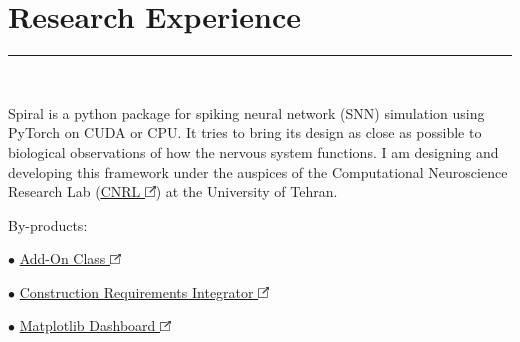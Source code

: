 \documentclass[]{rahulworld-resume}
\begin{document}
\begin{minipage}[t]{0.595\textwidth} 

	\section{Research Experience}
	\vspace{-5pt}\noindent\rule{\textwidth}{0.4pt}
	 
	\noindent
	\hspace{5em}%
	\begin{minipage}{0.85\textwidth\vspace{5pt}}
		\vspace{3pt}\\
		\begin{justifying}
			Spiral is a python package for spiking neural network (SNN) simulation using PyTorch on CUDA or CPU.
			It tries to bring its design as close as possible to biological observations of how the nervous system functions.
			I am designing and developing this framework under the auspices of the Computational Neuroscience Research Lab (\href{https://cnrl.ut.ac.ir/}{\underline{CNRL \includegraphics[width=8pt]{icons/redirect.png}}}) at the University of Tehran.
		
			By-products:

			$\bullet$ \href{https://pypi.org/project/add-on-class/}{Add-On Class \includegraphics[width=8pt]{icons/redirect.png}}
			
			$\bullet$ \href{https://pypi.org/project/construction-requirements-integrator/}{Construction Requirements Integrator \includegraphics[width=8pt]{icons/redirect.png}}
			
			$\bullet$ \href{https://pypi.org/project/matplotlib-dashboard/}{Matplotlib Dashboard \includegraphics[width=8pt]{icons/redirect.png}}
			

\end{justifying}
\end{minipage}
\end{minipage}
\end{document}
